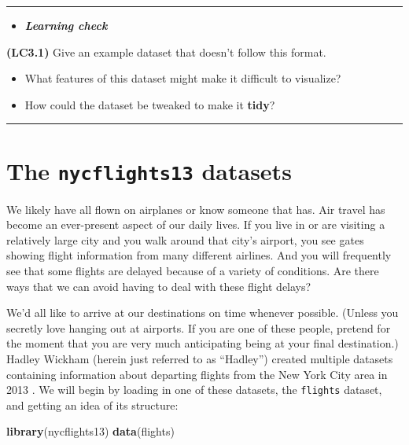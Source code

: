 \documentclass[]{tufte-book}
\newenvironment{Shaded}{\begin{snugshade}}{\end{snugshade}}
\newcommand{\KeywordTok}[1]{\textcolor[rgb]{0.13,0.29,0.53}{\textbf{{#1}}}}
\newcommand{\NormalTok}[1]{{#1}}
\let\oldrule=\rule
\renewcommand{\rule}[1]{\oldrule{\linewidth}}
\providecommand{\tightlist}{%
  \setlength{\itemsep}{0pt}\setlength{\parskip}{0pt}}
\newenvironment{rmdblock}[1]
  {\begin{shaded*}
  \begin{itemize}
  \renewcommand{\labelitemi}{
    \raisebox{-.7\height}[0pt][0pt]{
    }
  }
  \item
  }
  {
  \end{itemize}
  \end{shaded*}
  }
\newenvironment{learncheck}
  {\begin{rmdblock}{warning}}
  {\end{rmdblock}}
\begin{document}
\begin{center}\rule{0.5\linewidth}{\linethickness}\end{center}

\begin{learncheck}
\textbf{\emph{Learning check}}
\end{learncheck}

\textbf{(LC3.1)} Give an example dataset that doesn't follow this
format.

\begin{itemize}
\tightlist
\item
  What features of this dataset might make it difficult to visualize?\\
\item
  How could the dataset be tweaked to make it \textbf{tidy}?
\end{itemize}

\begin{center}\rule{0.5\linewidth}{\linethickness}\end{center}

\section{\texorpdfstring{The \texttt{nycflights13}
datasets}{The nycflights13 datasets}}\label{the-nycflights13-datasets}

We likely have all flown on airplanes or know someone that has. Air
travel has become an ever-present aspect of our daily lives. If you live
in or are visiting a relatively large city and you walk around that
city's airport, you see gates showing flight information from many
different airlines. And you will frequently see that some flights are
delayed because of a variety of conditions. Are there ways that we can
avoid having to deal with these flight delays?

We'd all like to arrive at our destinations on time whenever possible.
(Unless you secretly love hanging out at airports. If you are one of
these people, pretend for the moment that you are very much anticipating
being at your final destination.) Hadley Wickham (herein just referred
to as ``Hadley'') created multiple datasets containing information about
departing flights from the New York City area in 2013
\citep{R-nycflights13}. We will begin by loading in one of these
datasets, the \texttt{flights} dataset, and getting an idea of its
structure:

\begin{Shaded}
\begin{Highlighting}[]
\KeywordTok{library}\NormalTok{(nycflights13)}
\KeywordTok{data}\NormalTok{(flights)}
\end{Highlighting}
\end{Shaded}
\end{document}
